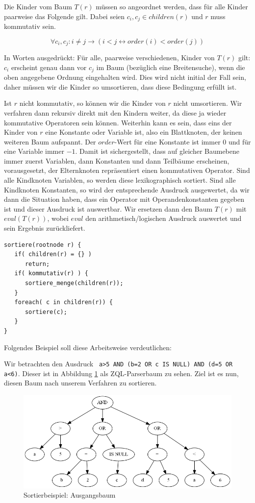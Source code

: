 Die Kinder vom Baum $T(r)$ müssen so angeordnet werden, dass für alle Kinder paarweise das Folgende gilt. Dabei seien $c_i,c_j\in\mathit{children}(r)$ und $r$ muss kommutativ sein.

$$\forall c_i,c_j : i\neq j \to  ( i<j \leftrightarrow order(i) < order(j) ) $$

In Worten ausgedrückt: Für alle, paarweise verschiedenen, Kinder von $T(r)$ gilt: $c_i$ erscheint genau dann vor $c_j$ im Baum (bezüglich eine Breitensuche), wenn die oben angegebene Ordnung eingehalten wird. Dies wird nicht initial der Fall sein, daher müssen wir die Kinder so umsortieren, dass diese Bedingung erfüllt ist. 

Ist $r$ nicht kommutativ, so können wir die Kinder von $r$ nicht umsortieren. Wir verfahren dann rekursiv direkt mit den Kindern weiter, da diese ja wieder kommutative Operatoren sein können. Weiterhin kann es sein, dass eins der Kinder von $r$ eine Konstante oder Variable ist, also ein Blattknoten, der keinen weiteren Baum aufspannt. Der $\mathit{order}$-Wert für eine Konstante ist immer 0 und für eine Variable immer $-1$. Damit ist sichergestellt, dass auf gleicher Baumebene immer zuerst Variablen, dann Konstanten und dann Teilbäume erscheinen, vorausgesetzt, der Elternknoten repräsentiert einen kommutativen Operator.
Sind alle Kindknoten Variablen, so werden diese lexikographisch sortiert. Sind alle Kindknoten Konstanten, so wird der entsprechende Ausdruck ausgewertet, da wir dann die Situation haben, dass ein Operator mit Operandenkonstanten gegeben ist und dieser Ausdruck ist auswertbar. Wir ersetzen dann den Baum $T(r)$ mit $eval(T(r))$, wobei $eval$ den arithmetisch/logischen Ausdruck auswertet und sein Ergebnis zurückliefert.

\begin{verbatim}
sortiere(rootnode r) {
   if( children(r) = {} ) 
      return;
   if( kommutativ(r) ) {
      sortiere_menge(children(r));
   }
   foreach( c in children(r)) {
      sortiere(c);
   }
}
\end{verbatim}

Folgendes Beispiel soll diese Arbeitsweise verdeutlichen:

Wir betrachten den Ausdruck \verb| a>5 AND (b=2 OR c IS NULL) AND (d=5 OR a<6)|. Dieser ist in Abbildung \ref{fig:sort_ex0} als ZQL-Parserbaum zu sehen. Ziel ist es nun, diesen Baum nach unserem Verfahren zu sortieren.

\begin{figure}
\includegraphics[scale=0.6]{Bilder/sort_ex0.png}
\caption{Sortierbeispiel: Ausgangsbaum}
\label{fig:sort_ex0}
\end{figure}

